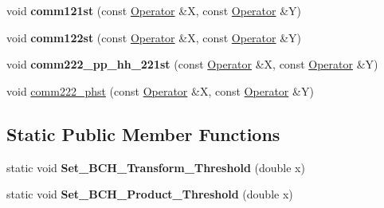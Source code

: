 \begin{DoxyCompactItemize}
\item 
\hypertarget{classOperator_aa2d57c0b2c5564d60e478eb10649ac3a}{void {\bfseries comm121st} (const \hyperlink{classOperator}{Operator} \&X, const \hyperlink{classOperator}{Operator} \&Y)}\label{classOperator_aa2d57c0b2c5564d60e478eb10649ac3a}

\item 
\hypertarget{classOperator_abc49b2355a2b45a6636fc99899a70616}{void {\bfseries comm122st} (const \hyperlink{classOperator}{Operator} \&X, const \hyperlink{classOperator}{Operator} \&Y)}\label{classOperator_abc49b2355a2b45a6636fc99899a70616}

\item 
\hypertarget{classOperator_a18deafc783e666ae2f9021a2a5dec2cb}{void {\bfseries comm222\-\_\-pp\-\_\-hh\-\_\-221st} (const \hyperlink{classOperator}{Operator} \&X, const \hyperlink{classOperator}{Operator} \&Y)}\label{classOperator_a18deafc783e666ae2f9021a2a5dec2cb}

\item 
void \hyperlink{classOperator_a85ffd47b8d0db4cdbb6ef4684adbedeb}{comm222\-\_\-phst} (const \hyperlink{classOperator}{Operator} \&X, const \hyperlink{classOperator}{Operator} \&Y)
\end{DoxyCompactItemize}
\subsection*{Static Public Member Functions}
\begin{DoxyCompactItemize}
\item 
\hypertarget{classOperator_a6f505221635444cb0b489b9ac600fd61}{static void {\bfseries Set\-\_\-\-B\-C\-H\-\_\-\-Transform\-\_\-\-Threshold} (double x)}\label{classOperator_a6f505221635444cb0b489b9ac600fd61}

\item 
\hypertarget{classOperator_a2c42843a1a557f2ab568d106e8fd23e8}{static void {\bfseries Set\-\_\-\-B\-C\-H\-\_\-\-Product\-\_\-\-Threshold} (double x)}\label{classOperator_a2c42843a1a557f2ab568d106e8fd23e8}

\end{DoxyCompactItemize}

